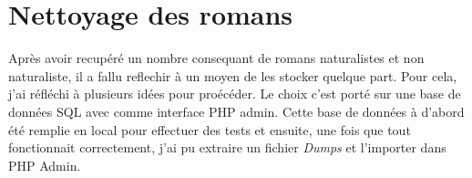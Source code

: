 \section{Nettoyage des romans}

Après avoir recupéré un nombre consequant de romans naturalistes et non naturaliste, il a fallu reflechir à un moyen de les stocker quelque part. Pour cela, j'ai réfléchi à plusieurs idées pour proécéder. Le choix c'est porté sur une base de données SQL avec comme interface PHP admin. Cette base de données à d'abord été remplie en local pour effectuer des tests et ensuite, une fois que tout fonctionnait correctement, j'ai pu extraire un fichier \textsl{Dumps} et l'importer dans PHP Admin.

